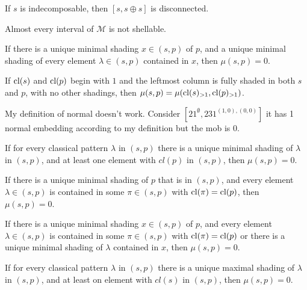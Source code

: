 \documentclass[11pt,a4paper,oneside]{article}
\begin{document}
\begin{lem}
If $s$ is indecomposable, then $[s,s\oplus s]$ is disconnected.
\end{lem}

\begin{conj}
Almost every interval of $\mathcal{M}$ is not shellable.
\end{conj}

\begin{lem}
If there is a unique minimal shading $x\in(s,p)$ of $p$, and a unique minimal shading of every element $\lambda\in(s,p)$ contained in $x$, then $\mu(s,p)=0$. 
\end{lem}

\begin{lem}
If $\operatorname{\textrm{cl}}(s)$ and $\operatorname{\textrm{cl}}(p)$ begin with $1$ and the leftmost column is fully shaded in both $s$ and $p$, with no other shadings, then $\mu(s,p)=\mu(\operatorname{\textrm{cl}}(s)_{>1},\operatorname{\textrm{cl}}(p)_{>1})$.
\end{lem}

\fi
	
\iffalse

My definition of normal doesn't work. Consider $[21^\emptyset,231^{(1, 0), (0, 0)}]$ it has 1 normal embedding according to my definition but the mob is $0$.

If for every classical pattern $\lambda$ in $(s,p)$ there is a unique minimal shading of $\lambda$ in $(s,p)$, and at least one element with $cl(p)$ in $(s,p)$, then $\mu(s,p)=0$.

If there is a unique minimal shading of $p$ that is in $(s,p)$, and every element $\lambda\in(s,p)$ is contained in some $\pi\in(s,p)$ with $\operatorname{\textrm{cl}}(\pi)=\operatorname{\textrm{cl}}(p)$, then $\mu(s,p)=0$. 

If there is a unique minimal shading $x\in(s,p)$ of $p$, and every element $\lambda\in(s,p)$ is contained in some $\pi\in(s,p)$ with $\operatorname{\textrm{cl}}(\pi)=\operatorname{\textrm{cl}}(p)$ or there is a unique minimal shading of $\lambda$ contained in $x$, then $\mu(s,p)=0$.


If for every classical pattern $\lambda$ in $(s,p)$ there is a unique maximal shading of $\lambda$ in $(s,p)$, and at least on element with $cl(s)$ in $(s,p)$, then $\mu(s,p)=0$.
\end{document}
